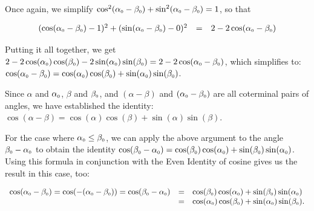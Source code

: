 Once again, we simplify $\cos^2(\alpha_{\mbox{\tiny $0$}} - \beta_{\mbox{\tiny $0$}}) + \sin^2(\alpha_{\mbox{\tiny $0$}} - \beta_{\mbox{\tiny $0$}})= 1$, so that

\[ \begin{array}{rcl}
(\cos(\alpha_{\mbox{\tiny $0$}} - \beta_{\mbox{\tiny $0$}}) - 1)^2 + (\sin(\alpha_{\mbox{\tiny $0$}} - \beta_{\mbox{\tiny $0$}}) - 0)^2 & = & 2  - 2\cos(\alpha_{\mbox{\tiny $0$}} - \beta_{\mbox{\tiny $0$}}) \\ \end{array} \]

Putting it all together, we get $2  - 2\cos(\alpha_{\mbox{\tiny $0$}})\cos(\beta_{\mbox{\tiny $0$}}) - 2\sin(\alpha_{\mbox{\tiny $0$}})\sin(\beta_{\mbox{\tiny $0$}}) = 2  - 2\cos(\alpha_{\mbox{\tiny $0$}} - \beta_{\mbox{\tiny $0$}})$, which simplifies to: $\cos(\alpha_{\mbox{\tiny $0$}} - \beta_{\mbox{\tiny $0$}}) = \cos(\alpha_{\mbox{\tiny $0$}})\cos(\beta_{\mbox{\tiny $0$}}) + \sin(\alpha_{\mbox{\tiny $0$}})\sin(\beta_{\mbox{\tiny $0$}})$. 

\smallskip

Since $\alpha$ and $\alpha_{\mbox{\tiny $0$}}$, $\beta$ and $\beta_{\mbox{\tiny $0$}}$, and $(\alpha - \beta)$ and $(\alpha_{\mbox{\tiny $0$}}- \beta_{\mbox{\tiny $0$}})$ are all coterminal pairs of angles, we have established the identity: $\cos(\alpha - \beta) = \cos(\alpha) \cos(\beta) + \sin(\alpha) \sin(\beta)$. 

\smallskip

For the case where $\alpha_{\mbox{\tiny $0$}} \leq \beta_{\mbox{\tiny $0$}}$, we can apply the above argument to the angle $\beta_{\mbox{\tiny $0$}} - \alpha_{\mbox{\tiny $0$}}$ to obtain the identity  $\cos(\beta_{\mbox{\tiny $0$}} - \alpha_{\mbox{\tiny $0$}}) = \cos(\beta_{\mbox{\tiny $0$}})\cos(\alpha_{\mbox{\tiny $0$}}) + \sin(\beta_{\mbox{\tiny $0$}})\sin(\alpha_{\mbox{\tiny $0$}})$.  Using this formula in conjunction with  the  Even Identity of cosine gives us the result in this case, too: 

\[ \begin{array}{rcl}  \cos(\alpha_{\mbox{\tiny $0$}} - \beta_{\mbox{\tiny $0$}}) =  \cos( - (\alpha_{\mbox{\tiny $0$}} - \beta_{\mbox{\tiny $0$}}))  =  \cos(\beta_{\mbox{\tiny $0$}} - \alpha_{\mbox{\tiny $0$}})  & = & \cos(\beta_{\mbox{\tiny $0$}})\cos(\alpha_{\mbox{\tiny $0$}}) + \sin(\beta_{\mbox{\tiny $0$}})\sin(\alpha_{\mbox{\tiny $0$}}) \\
& = & \cos(\alpha_{\mbox{\tiny $0$}})\cos(\beta_{\mbox{\tiny $0$}}) + \sin(\alpha_{\mbox{\tiny $0$}})\sin(\beta_{\mbox{\tiny $0$}}). \end{array} \]

